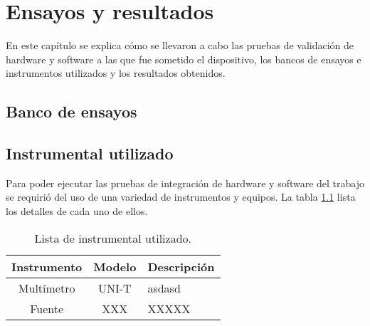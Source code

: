 
\chapter{Ensayos y resultados} %

\label{Chapter4} %


En este capítulo se explica cómo se llevaron a cabo las pruebas de validación de hardware y software a las que fue sometido el dispositivo, los bancos de ensayos e instrumentos utilizados y los resultados obtenidos.

\section{Banco de ensayos}



\section{Instrumental utilizado}

Para poder ejecutar las pruebas de integración de hardware y software del trabajo se requirió del uso de una variedad de instrumentos y equipos. La tabla \ref{tab:instrumentos} lista los detalles de cada uno de ellos.

\begin{table}[H]
	\centering
	\caption{Lista de instrumental utilizado.}
	\begin{tabular}{c c l}
		\toprule
		\textbf{Instrumento} & \textbf{Modelo} & \textbf{Descripción} \\
		\midrule
		Multímetro			&  UNI-T 				& asdasd \\
		Fuente 				& XXX					& XXXXX \\

		\bottomrule
		\hline
	\end{tabular}
	\label{tab:instrumentos}
\end{table}

